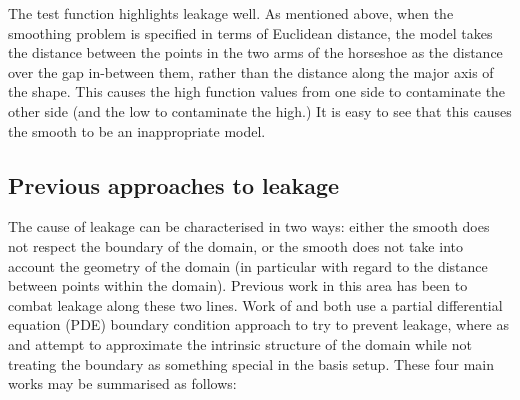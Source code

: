 The test function highlights leakage well. As mentioned above, when the smoothing problem is specified in terms of Euclidean distance, the model takes the distance between the points in the two arms of the horseshoe as the distance over the gap in-between them, rather than the distance along the major axis of the shape. This causes the high function values from one side to contaminate the other side (and the low to contaminate the high.) It is easy to see that this causes the smooth to be an inappropriate model.
		
\subsection{Previous approaches to leakage}
\label{intro-leakageapproaches}

The cause of leakage can be characterised in two ways: either the smooth does not respect the boundary of the domain, or the smooth does not take into account the geometry of the domain (in particular with regard to the distance between points within the domain). Previous work in this area has been to combat leakage along these two lines. Work of  and  both use a partial differential equation (PDE) boundary condition approach to try to prevent leakage, where as  and   attempt to approximate the intrinsic structure of the domain while not treating the boundary as something special in the basis setup. These four main works may be summarised as follows:

